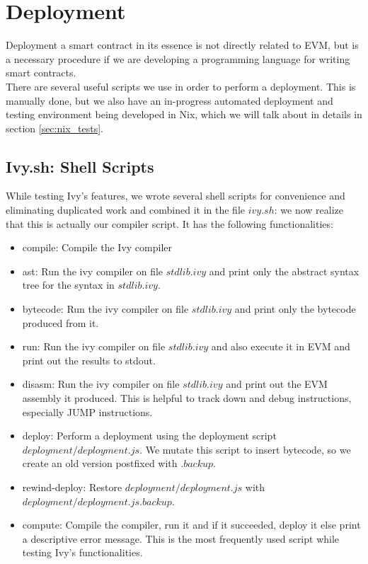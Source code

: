 \documentclass{article}
\begin{document}
\section{Deployment}
\label{deployment}
Deployment a smart contract in its essence is not directly related to EVM, but is a necessary procedure if we are developing a programming language for writing smart contracts. \\
There are several useful scripts we use in order to perform a deployment. This is manually done, but we also have an in-progress automated deployment and testing environment being developed in Nix, which we will talk about in details in section \ref{sec:nix_tests}.
\subsection{Ivy.sh: Shell Scripts}
While testing Ivy's features, we wrote several shell scripts for convenience and eliminating duplicated work and combined it in the file $ivy.sh$: we now realize that this is actually our compiler script. It has the following functionalities:
\newpage
\begin{itemize}
  \item compile: Compile the Ivy compiler
  \item ast: Run the ivy compiler on file $stdlib.ivy$ and print only the abstract syntax tree for the syntax in $stdlib.ivy$.
  \item bytecode: Run the ivy compiler on file $stdlib.ivy$ and print only the bytecode produced from it.
  \item run: Run the ivy compiler on file $stdlib.ivy$ and also execute it in EVM and print out the results to stdout.
  \item disasm: Run the ivy compiler on file $stdlib.ivy$ and print out the EVM assembly it produced. This is helpful to track down and debug instructions, especially JUMP instructions.
  \item deploy: Perform a deployment using the deployment script $deployment/deployment.js$. We mutate this script to insert bytecode, so we create an old version postfixed with $.backup$.
  \item rewind-deploy: Restore $deployment/deployment.js$ with $deployment/deployment.js.backup$.
  \item compute: Compile the compiler, run it and if it succeeded, deploy it else print a descriptive error message. This is the most frequently used script while testing Ivy's functionalities.
\end{itemize}
\end{document}
